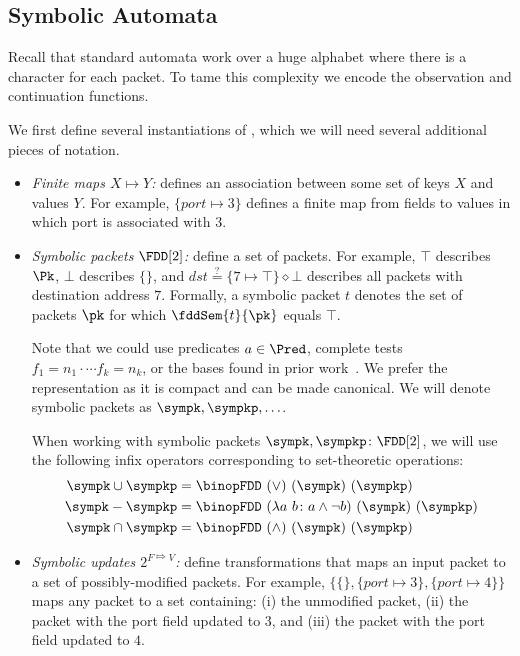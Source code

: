 \subsection{Symbolic \NetKAT Automata}\label{sec:sym-automata}

Recall that standard \NetKAT automata work over a huge alphabet where
there is a character for each packet. To tame this complexity we
encode the observation and continuation functions.

We first define several instantiations of \FDDs, which we will need
several additional pieces of notation.
\begin{itemize}
\item{\emph{Finite maps $X \mapsto Y$:}} defines an association between
  some set of keys $X$ and values $Y$. For example, $\{ \mathit{port}
  \mapsto 3 \}$ defines a finite map from fields to values in which
  port is associated with $3$.
\item{\emph{Symbolic packets $\FDD[2]$:}} define a set of packets.
  For example, $\top$ describes $\Pk$, $\bot$ describes $\{\}$, and
  $\mathit{dst} \stackrel ? = \{ 7 \mapsto \top \} \diamond \bot$
  describes all packets with destination address $7$. Formally, a
  symbolic packet $t$ denotes the set of packets $\pk$ for which
  $\fddSem{t}{\pk}$ equals $\top$.

  Note that we could use predicates $a \in \Pred$, complete tests
  $f_1=n_1 \cdot \cdots f_k =n_k$, or the bases found in prior
  work~\cite{coalgebraic}. We prefer the \FDD{} representation as it
  is compact and can be made canonical. We will denote symbolic
  packets as $\sympk,\sympkp, \ldots$.

  When working with symbolic packets $\sympk, \sympkp\colon \FDD[2]$,
  we will use the following infix operators corresponding to
  set-theoretic operations:
  \begin{align*}
  \sympk \cup \sympkp &= \binopFDD\ (\vee)\ (\sympk)\ (\sympkp)\\
  \sympk - \sympkp &= \binopFDD\ (\lambda a\ b\colon a\wedge \neg b)\ (\sympk)\ (\sympkp)\\
  \sympk \cap \sympkp &= \binopFDD\ (\wedge)\ (\sympk)\ (\sympkp)
  \end{align*}

\item{\emph{Symbolic updates $2^{F \Mapsto V}$:}} define
  transformations that maps an input packet to a set of
  possibly-modified packets. For example, $\{ \{\}, \{ \mathit{port}
  \mapsto 3 \}, \{ \mathit{port} \mapsto 4 \} \}$ maps any packet to a
  set containing: (i) the unmodified packet, (ii) the packet with the
  port field updated to $3$, and (iii) the packet with the port field
  updated to $4$.


\end{itemize}
